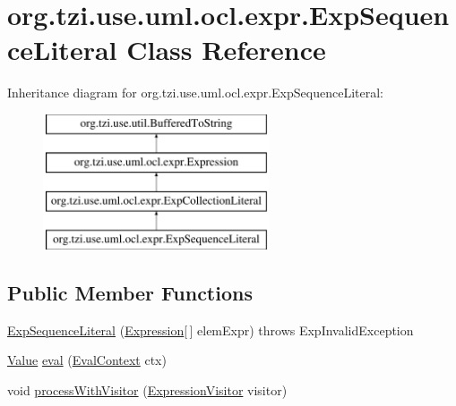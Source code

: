 \hypertarget{classorg_1_1tzi_1_1use_1_1uml_1_1ocl_1_1expr_1_1_exp_sequence_literal}{\section{org.\-tzi.\-use.\-uml.\-ocl.\-expr.\-Exp\-Sequence\-Literal Class Reference}
\label{classorg_1_1tzi_1_1use_1_1uml_1_1ocl_1_1expr_1_1_exp_sequence_literal}
}
Inheritance diagram for org.\-tzi.\-use.\-uml.\-ocl.\-expr.\-Exp\-Sequence\-Literal\-:\begin{figure}[H]
\begin{center}
\leavevmode
\includegraphics[height=4.000000cm]{classorg_1_1tzi_1_1use_1_1uml_1_1ocl_1_1expr_1_1_exp_sequence_literal}
\end{center}
\end{figure}
\subsection*{Public Member Functions}
\begin{DoxyCompactItemize}
\item 
\hyperlink{classorg_1_1tzi_1_1use_1_1uml_1_1ocl_1_1expr_1_1_exp_sequence_literal_a7746ac139e73226c83fb632fe35ec25a}{Exp\-Sequence\-Literal} (\hyperlink{classorg_1_1tzi_1_1use_1_1uml_1_1ocl_1_1expr_1_1_expression}{Expression}\mbox{[}$\,$\mbox{]} elem\-Expr)  throws Exp\-Invalid\-Exception     
\item 
\hyperlink{classorg_1_1tzi_1_1use_1_1uml_1_1ocl_1_1value_1_1_value}{Value} \hyperlink{classorg_1_1tzi_1_1use_1_1uml_1_1ocl_1_1expr_1_1_exp_sequence_literal_a4cc0e5eb017637c381a660ea794d36a7}{eval} (\hyperlink{classorg_1_1tzi_1_1use_1_1uml_1_1ocl_1_1expr_1_1_eval_context}{Eval\-Context} ctx)
\item 
void \hyperlink{classorg_1_1tzi_1_1use_1_1uml_1_1ocl_1_1expr_1_1_exp_sequence_literal_a3798d7f1c87f5beddd339c421d24e7b8}{process\-With\-Visitor} (\hyperlink{interfaceorg_1_1tzi_1_1use_1_1uml_1_1ocl_1_1expr_1_1_expression_visitor}{Expression\-Visitor} visitor)
\end{DoxyCompactItemize}
